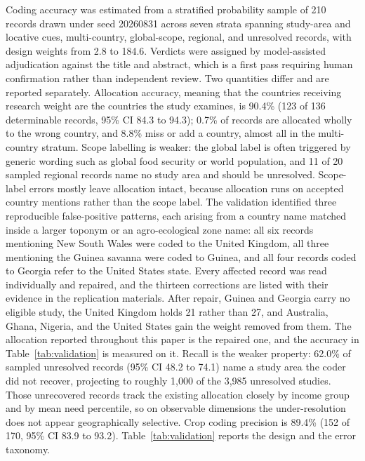 \documentclass[ASNA,twocolumn]{USG}
\begin{document}
Coding accuracy was estimated from a stratified probability sample of 210 records drawn under
seed 20260831 across seven strata spanning study-area and locative cues, multi-country,
global-scope, regional, and unresolved records, with design weights from 2.8 to 184.6. Verdicts
were assigned by model-assisted adjudication against the title and abstract, which is a first
pass requiring human confirmation rather than independent review. Two quantities differ and are
reported separately. Allocation accuracy, meaning that the countries receiving research weight
are the countries the study examines, is 90.4\% (123 of 136 determinable records, 95\% CI 84.3 to
94.3); 0.7\% of records are allocated wholly to the wrong country, and 8.8\% miss or add a
country, almost all in the multi-country stratum. Scope labelling is weaker: the global label is
often triggered by generic wording such as global food security or world population, and 11 of 20
sampled regional records name no study area and should be unresolved. Scope-label errors mostly
leave allocation intact, because allocation runs on accepted country mentions rather than the
scope label. The validation identified three reproducible false-positive patterns, each arising from a country
name matched inside a larger toponym or an agro-ecological zone name: all six records mentioning New
South Wales were coded to the United Kingdom, all three mentioning the Guinea savanna were coded to
Guinea, and all four records coded to Georgia refer to the United States state. Every affected
record was read individually and repaired, and the thirteen corrections are listed with their
evidence in the replication materials. After repair, Guinea and Georgia carry no eligible study, the
United Kingdom holds 21 rather than 27, and Australia, Ghana, Nigeria, and the United States gain
the weight removed from them. The allocation reported throughout this paper is the repaired one, and
the accuracy in Table~\ref{tab:validation} is measured on it. Recall is the weaker property: 62.0\% of sampled unresolved records (95\% CI 48.2 to 74.1)
name a study area the coder did not recover, projecting to roughly 1,000 of the 3,985 unresolved
studies. Those unrecovered records track the existing allocation closely by income group and by
mean need percentile, so on observable dimensions the under-resolution does not appear
geographically selective. Crop coding precision is 89.4\% (152 of 170, 95\% CI 83.9 to 93.2).
Table~\ref{tab:validation} reports the design and the error taxonomy.
\end{document}
